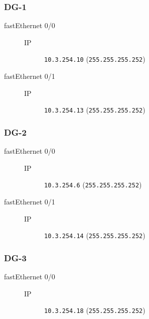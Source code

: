 \subsubsection{DG-1}

	\begin{description}
		\item[fastEthernet 0/0] 
		\begin{description}
			\item[IP] \texttt{10.3.254.10} (\texttt{255.255.255.252})
		\end{description}

		\item[fastEthernet 0/1] 
		\begin{description}
			\item[IP] \texttt{10.3.254.13} (\texttt{255.255.255.252})
		\end{description}

	\end{description}
\subsubsection{DG-2}

	\begin{description}
		\item[fastEthernet 0/0] 
		\begin{description}
			\item[IP] \texttt{10.3.254.6} (\texttt{255.255.255.252})
		\end{description}

		\item[fastEthernet 0/1] 
		\begin{description}
			\item[IP] \texttt{10.3.254.14} (\texttt{255.255.255.252})
		\end{description}

	\end{description}
\subsubsection{DG-3}

	\begin{description}
		\item[fastEthernet 0/0] 
		\begin{description}
			\item[IP] \texttt{10.3.254.18} (\texttt{255.255.255.252})
		\end{description}

	\end{description}
